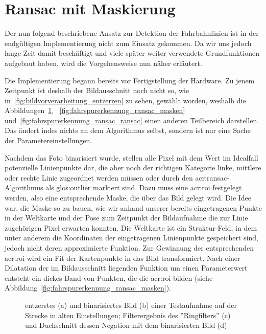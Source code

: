 \section{Ransac mit Maskierung} \label{sec:maskenbau}

Der nun folgend beschriebene Ansatz zur Detektion der Fahrbahnlinien ist in der endgültigen Implementierung nicht zum Einsatz gekommen. Da wir uns jedoch lange Zeit damit beschäftigt und viele später weiter verwendete Grundfunktionen aufgebaut haben, wird die Vorgehensweise nun näher erläutert.

Die Implementierung begann bereits vor Fertigstellung der Hardware. Zu jenem Zeitpunkt ist deshalb der Bildausschnitt noch nicht so, wie in~\ref{fig:bildvorverarbeitung_entzerren} zu sehen, gewählt worden, weshalb die Abbildungen~\ref{fig:fahrspurerkennung_ransac_binarisieren}, ~\ref{fig:fahrspurerkennung_ransac_masken} und~\ref{fig:fahrspurerkennung_ransac_ransac} einen anderen Teilbereich darstellen. Das ändert indes nichts an dem Algorithmus selbst, sondern ist nur eine Sache der Parametereinstellungen. 

Nachdem das Foto binarisiert wurde, stellen alle Pixel mit dem Wert \grqq{} im Idealfall potenzielle Linienpunkte dar, die aber noch der richtigen Kategorie \glqq linke\grqq , \glqq mittlere\grqq{} oder \glqq rechte\grqq{} Linie zugeordnet werden müssen oder durch den \gls{acr:ransac}-Algorithmus als \gls{glos:outlier} markiert sind. Dazu muss eine \gls{acr:roi} festgelegt werden, also eine entsprechende Maske, die über das Bild gelegt wird. Die Idee war, die Maske so zu bauen, wie wir anhand unserer bereits eingetragenen Punkte in der Weltkarte und der Pose zum Zeitpunkt der Bildaufnahme die zur Linie zugehörigen Pixel erwarten konnten. Die Weltkarte ist ein Struktur-Feld, in dem unter anderem die Koordinaten der eingetragenen Linienpunkte gespeichert sind, jedoch nicht deren approximierte Funktion. Zur Gewinnung der entsprechenden \gls{acr:roi} wird ein Fit der Kartenpunkte in das Bild transformiert. Nach einer Dilatation der im Bildausschnitt liegenden Funktion um einen Parameterwert entsteht ein dickes Band von Punkten, die die \gls{acr:roi} bilden (siehe Abbildung~\ref{fig:fahrspurerkennung_ransac_masken}).

\begin{figure}[H]
  \centering
  \qquad \quad
  \qquad \quad
  \qquad \quad
  \caption{entzerrtes (a) und binarisiertes Bild (b) einer Testaufnahme auf der Strecke in alten Einstellungen; Filterergebnis des ''Ringfilters'' (c) und Duchschnitt dessen Negation mit dem binarisierten Bild (d)}
\label{fig:fahrspurerkennung_ransac_binarisieren}
\end{figure} 

